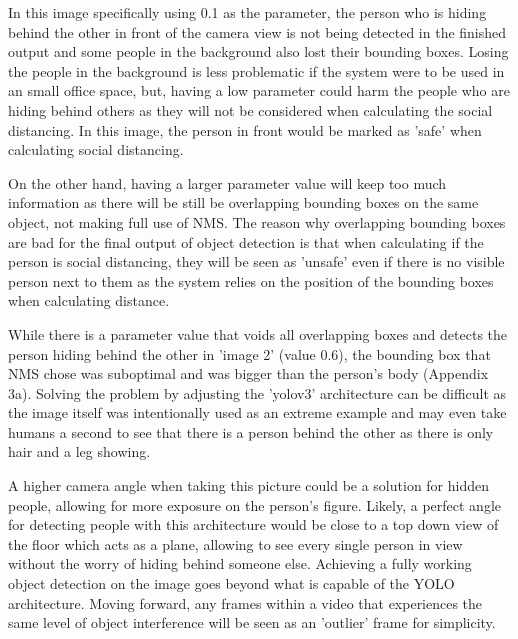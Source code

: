 \documentclass[12pt]{report}
\begin{document}
\vspace{2mm}

In this image specifically using 0.1 as the parameter, the person who is hiding behind the other in front of the camera view is not being detected in the finished output and some people in the background also lost their bounding boxes. Losing the people in the background is less problematic if the system were to be used in an small office space, but, having a low parameter could harm the people who are hiding behind others as they will not be considered when calculating the social distancing. In this image, the person in front would be marked as 'safe' when calculating social distancing.

\vspace{2mm}

On the other hand, having a larger parameter value will keep too much information as there will be still be overlapping bounding boxes on the same object, not making full use of NMS. The reason why overlapping bounding boxes are bad for the final output of object detection is that when calculating if the person is social distancing, they will be seen as 'unsafe' even if there is no visible person next to them as the system relies on the position of the bounding boxes when calculating distance.

\vspace{2mm}

While there is a parameter value that voids all overlapping boxes and detects the person hiding behind the other in 'image 2' (value 0.6), the bounding box that NMS chose was suboptimal and was bigger than the person's body (Appendix 3a). Solving the problem by adjusting the 'yolov3' architecture can be difficult as the image itself was intentionally used as an extreme example and may even take humans a second to see that there is a person behind the other as there is only hair and a leg showing.

\vspace{2mm}

A higher camera angle when taking this picture could be a solution for hidden people, allowing for more exposure on the person's figure. Likely, a perfect angle for detecting people with this architecture would be close to a top down view of the floor which acts as a plane, allowing to see every single person in view without the worry of hiding behind someone else. Achieving a fully working object detection on the image goes beyond what is capable of the YOLO architecture. Moving forward, any frames within a video that experiences the same level of object interference will be seen as an 'outlier' frame for simplicity. 
\end{document}
